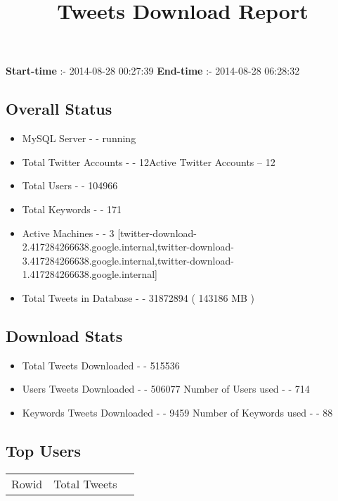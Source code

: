 \documentclass{article}\usepackage[T1]{fontenc}
\begin{document}
\title{\textbf{Tweets Download Report}}
               \date{}
                \maketitle
               \centerline{\textbf{Start-time} :- 2014-08-28 00:27:39 \hspace{40pt} \textbf{End-time} :- 2014-08-28 06:28:32}               \subsection*{Overall Status}                \begin{itemize}                \item MySQL Server - - running               \item Total Twitter Accounts - - 12\newline Active Twitter Accounts -- 12               \item Total Users - - 104966               \item Total Keywords - - 171               \item Active Machines - - 3 [twitter-download-2.417284266638.google.internal,twitter-download-3.417284266638.google.internal,twitter-download-1.417284266638.google.internal]               \item Total Tweets in Database - - 31872894 ( 143186 MB )               \end{itemize}               \subsection*{Download Stats}                \begin{itemize}                \item Total Tweets Downloaded - - 515536               \item Users Tweets Downloaded - - 506077 \newline Number of Users used - - 714               \item Keywords Tweets Downloaded - - 9459 \newline Number of Keywords used - - 88              \end{itemize}              \subsection*{Top Users}\begin{tabular}{|c|c|c|}         \hline         Rowid & Total Tweets \\ 

\end{tabular}
\end{document}
